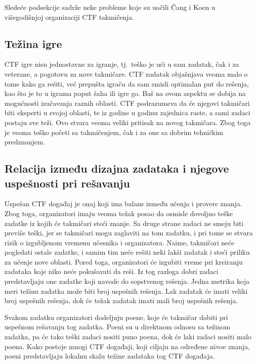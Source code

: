 \documentclass[12pt, a4paper, twocolumn]{article}
\begin{document}
Sledeće podsekcije sadrže neke probleme koje su uočili Čang i Koen 
\cite{ctf_chung} u višegodišnjoj organizaciji CTF takmičenja.

\subsection{Težina igre}

CTF igre nisu jednostavne za igranje, tj.\ teško je ući u sam zadatak, čak i
za veterane, a pogotovu za nove takmičare. CTF zadatak objašnjava veoma
malo o tome kako ga rešiti, već prepušta igraču da sam smisli optimalan put
do rešenja, kao što je to u igrama poput šaha ili igre go. Baš na ovom aspektu
se dobija na mogućnosti izučavanja raznih oblasti. CTF podrazumeva da će
njegovi takmičari biti eksperti u svojoj oblasti, te iz godine u godinu
zajednica raste, a sami zadaci postaju sve teži. Ovo stvara veoma veliki 
pritisak na novog takmičara. Zbog toga je veoma teško početi sa takmičenjem,
čak i za one sa dobrim tehničkim predznanjem.

\subsection{Relacija između dizajna zadataka i njegove uspešnosti pri rešavanju}

Uspešan CTF događaj je onaj koji ima balans između učenja i provere znanja.
Zbog toga, organizatori imaju veoma težak posao da osmisle dovoljno teške 
zadatke iz kojih će takmičari steći znanje. Sa druge strane zadaci ne
smeju biti previše teški, jer se takmičari mogu zaglaviti na tom zadatku, i
pri tome se stvara rizik o izgubljenom vremenu učesnika i organizatora. Naime, 
takmičari neće pogledati ostale zadatke, i samim tim neće rešiti neki lakši 
zadatak i steći priliku za učenje nove oblasti. Pored toga, organizatori će
izgubiti vreme pri kreiranju zadataka koje niko neće pokušavati da reši. Iz
tog razloga dobri zadaci predstavljaju one zadatke koji navode do sopstvenog 
rešenja. Jedna metrika koja meri težinu zadatka može biti broj uspešnih 
rešenja. Lak zadatak će imati veliki broj uspešnih rešenja, dok će težak 
zadatak imati mali broj uspešnih rešenja.

Svakom zadatku organizatori dodeljuju poene, koje će takmičar dobiti pri
uspešnom rešavanju tog zadatka. Poeni su u direktnom odnosu sa težinom 
zadatka, pa će tako teški zadaci nositi puno poena, dok će laki zadaci nositi 
malo poena. Kako postoje mnogi CTF događaji, koji ciljaju na određene nivoe 
znanja, poeni predstavljaju lokalnu skalu težine zadataka tog CTF događaja.
\end{document}
